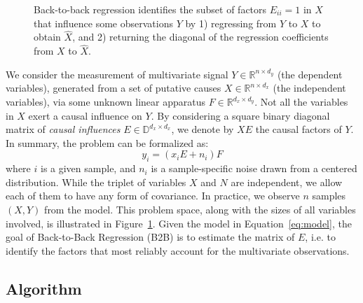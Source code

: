 \documentclass[preprint,12pt,3p]{elsarticle}
\begin{document}
\begin{figure}[t!]
  \caption{Back-to-back regression identifies the subset of factors $E_{ii} = 1$ in $X$ that influence some observations $Y$ by 1) regressing from $Y$ to $X$ to obtain $\hat{X}$, and 2) returning the diagonal of the regression coefficients from $X$ to $\hat{X}$.}
\label{fig:b2b}
\end{figure}

We consider the measurement of multivariate signal $Y \in \mathbb{R}^{n \times
d_y}$ (the dependent variables), generated from a set of putative causes $X \in \mathbb{R}^{n \times
d_x}$ (the independent variables), via some unknown linear apparatus $F \in \mathbb{R}^{d_x \times d_y}$.
%
Not all the variables in $X$ exert a causal influence on $Y$.
%
By considering a square binary diagonal matrix of \emph{causal influences} $E
\in \mathbb{D}^{d_x \times d_x}$, we denote by $XE$ the causal factors of $Y$.
%
In summary, the problem can be formalized as:
%
\begin{equation}
    y_i = (x_i E + n_i) F
    \label{eq:model}
\end{equation}
%
where $i$ is a given sample, and $n_i$ is a sample-specific noise drawn from a
centered distribution.
%
While the triplet of variables $X$ and $N$ are independent, we allow each of
them to have any form of covariance.
%
In practice, we observe $n$ samples $(X, Y)$ from the model.
%
This problem space, along with the sizes of all variables involved, is
illustrated in Figure~\ref{fig:b2b}.
%
Given the model in Equation~\cref{eq:model}, the goal of Back-to-Back
Regression (B2B) is to estimate the matrix of $E$, i.e. to identify the factors
that most reliably account for the multivariate observations.

\subsection{Algorithm}
\end{document}
